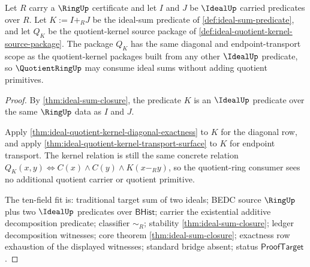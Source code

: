 \begin{theorem}
\label{thm:ideal-sum-quotientring-kernel-scope}
Let $R$ carry a $\RingUp$ certificate and let $I$ and $J$ be $\IdealUp$ carried predicates over $R$. Let $K:=I+_RJ$ be the ideal-sum predicate of \autoref{def:ideal-sum-predicate}, and let $Q_K$ be the quotient-kernel source package of \autoref{def:ideal-quotient-kernel-source-package}. The package $Q_K$ has the same diagonal and endpoint-transport scope as the quotient-kernel packages built from any other $\IdealUp$ predicate, so $\QuotientRingUp$ may consume ideal sums without adding quotient primitives.
\end{theorem}
\begin{proof}
By \autoref{thm:ideal-sum-closure}, the predicate $K$ is an $\IdealUp$ predicate over the same $\RingUp$ data as $I$ and $J$.

Apply \autoref{thm:ideal-quotient-kernel-diagonal-exactness} to $K$ for the diagonal row, and apply \autoref{thm:ideal-quotient-kernel-transport-surface} to $K$ for endpoint transport. The kernel relation is still the same concrete relation $Q_K(x,y)\Longleftrightarrow C(x)\land C(y)\land K(x-_R y)$, so the quotient-ring consumer sees no additional quotient carrier or quotient primitive.

The ten-field fit is: traditional target sum of two ideals; BEDC source $\RingUp$ plus two $\IdealUp$ predicates over $\mathsf{BHist}$; carrier the existential additive decomposition predicate; classifier $\sim_R$; stability \autoref{thm:ideal-sum-closure}; ledger decomposition witnesses; core theorem \autoref{thm:ideal-sum-closure}; exactness row exhaustion of the displayed witnesses; standard bridge absent; status $\mathsf{ProofTarget}$.
\end{proof}

